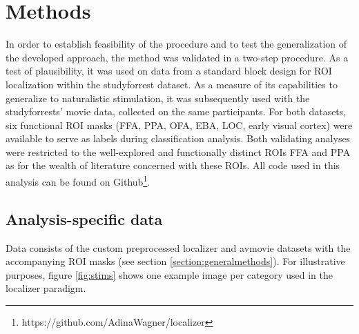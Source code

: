 \documentclass[a4paper, 12pt]{scrreprt}
\begin{document}
\section{Methods}\label{c1:methods}
In order to establish feasibility of the procedure and to test the generalization of the developed approach, the method was validated in a two-step procedure. As a test of plausibility, it was used on data from a standard block design for ROI localization within the studyforrest dataset. As a measure of its capabilities to generalize to naturalistic stimulation, it was subsequently used with the studyforrests' movie data, collected on the same participants. For both datasets, six functional ROI masks (FFA, PPA, OFA, EBA, LOC, early visual cortex) were available to serve as labels during classification analysis. Both validating analyses were restricted to the well-explored and functionally distinct ROIs FFA and PPA as for the wealth of literature concerned with these ROIs.  
All code used in this analysis can be found on Github\footnote{https://github.com/AdinaWagner/localizer}. 

\subsection{Analysis-specific data}

Data consists of the custom preprocessed localizer and avmovie datasets with the accompanying ROI masks (see section \ref{section:generalmethods}). For illustrative purposes, figure \ref{fig:stims} shows one example image per category used in the localizer paradigm.
\end{document}
